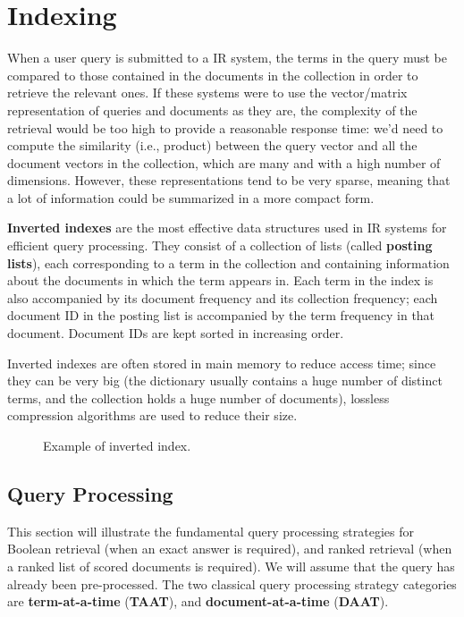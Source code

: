 \chapter{Indexing}

When a user query is submitted to a IR system, the terms in the query must be compared to those contained in the documents in the collection in order to retrieve the relevant ones. If these systems were to use the vector/matrix representation of queries and documents as they are, the complexity of the retrieval would be too high to provide a reasonable response time: we'd need to compute the similarity (i.e., product) between the query vector and all the document vectors in the collection, which are many and with a high number of dimensions. However, these representations tend to be very sparse, meaning that a lot of information could be summarized in a more compact form.

\textbf{Inverted indexes} are the most effective data structures used in IR systems for efficient query processing. They consist of a collection of lists (called \textbf{posting lists}), each corresponding to a term in the collection and containing information about the documents in which the term appears in. Each term in the index is also accompanied by its document frequency and its collection frequency; each document ID in the posting list is accompanied by the term frequency in that document. Document IDs are kept sorted in increasing order.

Inverted indexes are often stored in main memory to reduce access time; since they can be very big (the dictionary usually contains a huge number of distinct terms, and the collection holds a huge number of documents), lossless compression algorithms are used to reduce their size.
\clearpage
\begin{figure}[!h]
    \centering
    
    \caption{Example of inverted index.}
    \label{fig:inverted-index}
\end{figure}

\section{Query Processing}

This section will illustrate the fundamental query processing strategies for Boolean retrieval (when an exact answer is required), and ranked retrieval (when a ranked list of scored documents is required). We will assume that the query has already been pre-processed. The two classical query processing strategy categories are \textbf{term-at-a-time} (\textbf{TAAT}), and \textbf{document-at-a-time} (\textbf{DAAT}).

